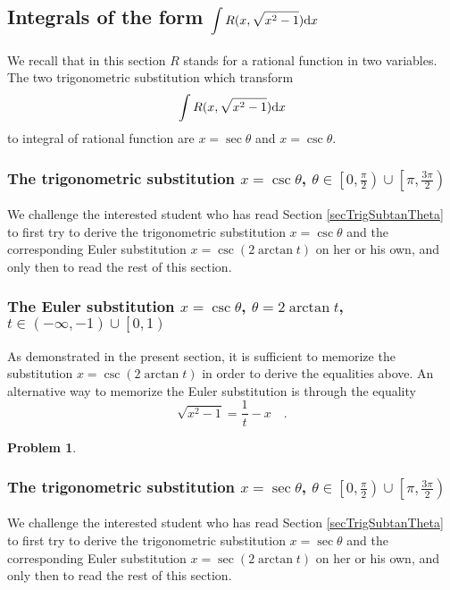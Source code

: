\documentclass[12pt]{book}
\newtheorem{problem}[theorem]{Problem}
\begin{document}
\subsection{Integrals of the form $\displaystyle \int R(x, \sqrt{x^2 -1}) {\normalfont \text{d}} x$}
We recall that in this section $R$ stands for a rational function in two variables. The two trigonometric substitution which transform
\[
\int R(x, \sqrt{x^2-1}){\normalfont \text{d}} x
\]
to integral of rational function are $x=\sec \theta$ and $x=\csc \theta$.

\subsubsection{The trigonometric substitution $x=\csc \theta$, $\theta \in \left[0, \frac{\pi}{2}\right)\cup \left[\pi, \frac{3\pi}{2}\right)$}
We challenge the interested student who has read Section \ref{secTrigSubtanTheta} to first try to derive the trigonometric substitution $x=\csc \theta$ and the corresponding Euler substitution $x=\csc (2\arctan t)$  on her or his own, and only then to read the rest of this section.





\subsubsection{The Euler substitution $x=\csc \theta$, $\theta=2\arctan t$, $ t\in (-\infty, -1) \cup \left[0, 1 \right) $}




As demonstrated in the present section, it is sufficient to memorize the substitution $x=\csc (2\arctan t)$ in order to derive the equalities above. An alternative way to memorize the Euler substitution is through the equality
\[
\sqrt{x^2-1}=\frac{1}{t}-x\quad .
\]
\begin{problem}

\end{problem}
\subsubsection{The trigonometric substitution $x=\sec \theta$, $\theta \in \left[0, \frac{\pi}{2}\right)\cup \left[\pi, \frac{3\pi}{2}\right) $}
We challenge the interested student who has read Section \ref{secTrigSubtanTheta} to first try to derive the trigonometric substitution $x=\sec \theta$ and the corresponding Euler substitution $x=\sec (2\arctan t)$  on her or his own, and only then to read the rest of this section.
\end{document}
